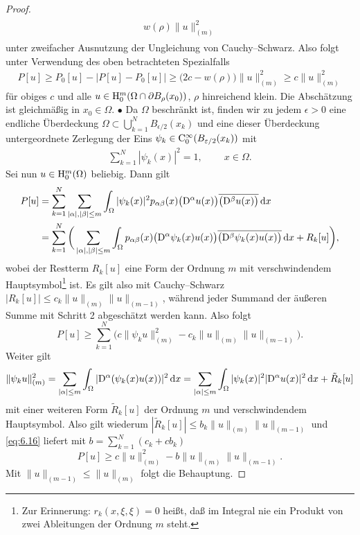 \begin{proof}
\begin{align}
\begin{split}
	 w(\rho) \|u\|_{(m)}^2
\end{split}
\end{align}
unter zweifacher Ausnutzung der Ungleichung von Cauchy--Schwarz. Also folgt unter Verwendung des oben betrachteten Spezialfalls
\begin{align}
	P[u] \ge P_0[u] - \big| P[u] - P_0[u] \big| \ge \big( 2c - w(\rho) \big) \|u\|_{(m)}^2 \ge  c \| u\|_{(m)}^2
\end{align} 
für obiges $c$ und alle $u\in \mathrm H_0^m(\Omega \cap \partial B_\rho(x_0))$,  $\rho$ hinreichend klein. Die Abschätzung ist gleichmäßig in $x_0\in\Omega$.
$\bullet$ Da $\Omega$ beschränkt ist, finden wir zu jedem $\epsilon>0$ eine endliche Überdeckung $\Omega\subset\bigcup_{k=1}^N B_{{\epsilon}/{2}}(x_k)$ und eine dieser Überdeckung untergeordnete Zerlegung der Eins $\psi_k\in\mathrm C_0^\infty(B_{\varepsilon/2}(x_k))$ mit
\begin{align}
 \sum\limits_{k=1}^N |\psi_k(x)|^2 = 1,\qquad \ x\in \Omega.
\end{align}
Sei nun $u\in\mathrm H_0^m(\Omega)$ beliebig. Dann gilt
\begin{equation}
\begin{split}
	P[u]&= \sum_{k=1}^N \sum\limits_{|\alpha|,|\beta|\le m} \int_\Omega |\psi_k(x)|^2p_{\alpha\beta}(x)\big(\mathrm D^\alpha u(x)\big)\overline{\big(\mathrm D^\beta u(x)\big)}\,\mathrm d x\\
	&=  \sum_{k=1}^N \bigg( \sum\limits_{|\alpha|,|\beta|\le m} \int_\Omega  p_{\alpha\beta}(x)\big(\mathrm D^\alpha \psi_k(x) u(x)\big)\overline{\big(\mathrm D^\beta \psi_k(x) u(x)\big)}\,\mathrm d x + R_k[u]\bigg),
\end{split}
\end{equation}
wobei der Restterm $R_k[u]$ eine Form der Ordnung $m$ mit verschwindendem Hauptsymbol\footnote{Zur Erinnerung: $r_k(x,\xi,\xi)=0$ heißt, daß im Integral nie ein Produkt von zwei Ableitungen der Ordnung $m$ steht.} ist. Es gilt also mit Cauchy--Schwarz $|R_k[u]|\le c_k \|u\|_{(m)} \|u\|_{(m-1)}$, während jeder Summand der äußeren Summe mit Schritt 2 abgeschätzt werden kann. Also folgt 
\begin{equation}\label{eq:6.16}
P[u] \ge \sum_{k=1}^N  \bigg( c \|\psi_k u\|_{(m)}^2 - c_k \|u\|_{(m)} \|u\|_{(m-1)} \bigg) .
\end{equation}
Weiter gilt 
\begin{equation}
   \|\psi_k u\|_{(m)}^2 =  \sum_{|\alpha|\le m} \int_\Omega |\mathrm D^\alpha (\psi_k(x) u(x)) |^2 \,\mathrm d x
   =   \sum_{|\alpha|\le m} \int_\Omega  |\psi_k(x)|^2  |\mathrm D^\alpha u(x) |^2 \,\mathrm d x + \tilde R_k[u]
\end{equation}
mit einer weiteren Form $\tilde R_k[u]$  der Ordnung $m$ und verschwindendem Hauptsymbol. Also gilt wiederum $|\tilde R_k[u]|\le b_k \|u\|_{(m)}\|u\|_{(m-1)}$ und  \eqref{eq:6.16} liefert mit $b= \sum_{k=1}^N (c_k + c b_k  )$
\begin{equation}\label{eq:6.18}
P[u] \ge c \|u\|_{(m)}^2 - b \|u\|_{(m)}\|u\|_{(m-1)} .
\end{equation}
Mit $\|u\|_{(m-1)}\le \|u\|_{(m)}$ folgt die Behauptung.
\end{proof}

